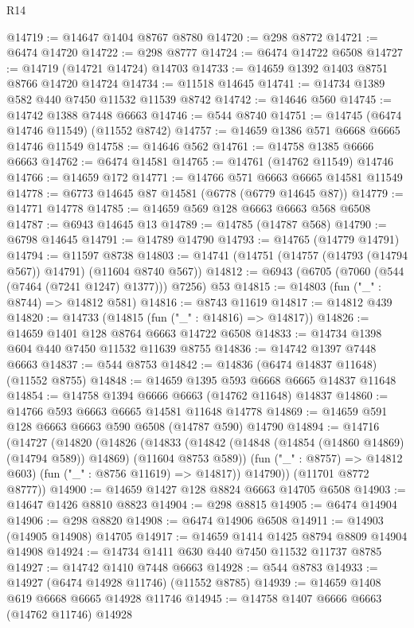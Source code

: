 \begin{lexlean}{R14}
\begin{coremodule}
{{{{{{{{{{{{{{{{{{{{{{{{{{{{{{{{{{{{{{{{{{{{{{{{{{{{{{{{{{{{{{{{{{{{{{{{{{{{{{{{{{@14719 := @14647 @1404 @8767 @8780
@14720 := @298 @8772
@14721 := @6474 @14720
@14722 := @298 @8777
@14724 := @6474 @14722 @6508
@14727 := @14719 (@14721 @14724) @14703
@14733 := @14659 @1392 @1403 @8751 @8766 @14720 @14724
@14734 := @11518 @14645
@14741 := @14734 @1389 @582 @440 @7450 @11532 @11539 @8742
@14742 := @14646 @560
@14745 := @14742 @1388 @7448 @6663
@14746 := @544 @8740
@14751 := @14745 (@6474 @14746 @11549) (@11552 @8742)
@14757 := @14659 @1386 @571 @6668 @6665 @14746 @11549
@14758 := @14646 @562
@14761 := @14758 @1385 @6666 @6663
@14762 := @6474 @14581
@14765 := @14761 (@14762 @11549) @14746
@14766 := @14659 @172
@14771 := @14766 @571 @6663 @6665 @14581 @11549
@14778 := @6773 @14645 @87 @14581 (@6778 (@6779 @14645 @87))
@14779 := @14771 @14778
@14785 := @14659 @569 @128 @6663 @6663 @568 @6508
@14787 := @6943 @14645 @13
@14789 := @14785 (@14787 @568)
@14790 := @6798 @14645
@14791 := @14789 @14790
@14793 := @14765 (@14779 @14791)
@14794 := @11597 @8738
@14803 := @14741 (@14751 (@14757 (@14793 (@14794 @567)) @14791) (@11604 @8740 @567))
@14812 := @6943 (@6705 (@7060 (@544 (@7464 (@7241 @1247) @1377))) @7256) @53
@14815 := @14803 (fun ("_" : @8744) => @14812 @581)
@14816 := @8743 @11619
@14817 := @14812 @439
@14820 := @14733 (@14815 (fun ("_" : @14816) => @14817))
@14826 := @14659 @1401 @128 @8764 @6663 @14722 @6508
@14833 := @14734 @1398 @604 @440 @7450 @11532 @11639 @8755
@14836 := @14742 @1397 @7448 @6663
@14837 := @544 @8753
@14842 := @14836 (@6474 @14837 @11648) (@11552 @8755)
@14848 := @14659 @1395 @593 @6668 @6665 @14837 @11648
@14854 := @14758 @1394 @6666 @6663 (@14762 @11648) @14837
@14860 := @14766 @593 @6663 @6665 @14581 @11648 @14778
@14869 := @14659 @591 @128 @6663 @6663 @590 @6508 (@14787 @590) @14790
@14894 := @14716
    (@14727
      (@14820
        (@14826
          (@14833
            (@14842 (@14848 (@14854 (@14860 @14869) (@14794 @589)) @14869) (@11604 @8753 @589))
            (fun ("_" : @8757) => @14812 @603)
            (fun ("_" : @8756 @11619) => @14817))
          @14790))
      (@11701 @8772 @8777))
@14900 := @14659 @1427 @128 @8824 @6663 @14705 @6508
@14903 := @14647 @1426 @8810 @8823
@14904 := @298 @8815
@14905 := @6474 @14904
@14906 := @298 @8820
@14908 := @6474 @14906 @6508
@14911 := @14903 (@14905 @14908) @14705
@14917 := @14659 @1414 @1425 @8794 @8809 @14904 @14908
@14924 := @14734 @1411 @630 @440 @7450 @11532 @11737 @8785
@14927 := @14742 @1410 @7448 @6663
@14928 := @544 @8783
@14933 := @14927 (@6474 @14928 @11746) (@11552 @8785)
@14939 := @14659 @1408 @619 @6668 @6665 @14928 @11746
@14945 := @14758 @1407 @6666 @6663 (@14762 @11746) @14928
}}}}}}}}}}}}}}}}}}}}}}}}}}}}}}}}}}}}}}}}}}}}}}}}}}}}}}}}}}}}}}}}}}}}}}}}}}}}}}}}}}
\end{coremodule}
\end{lexlean}
